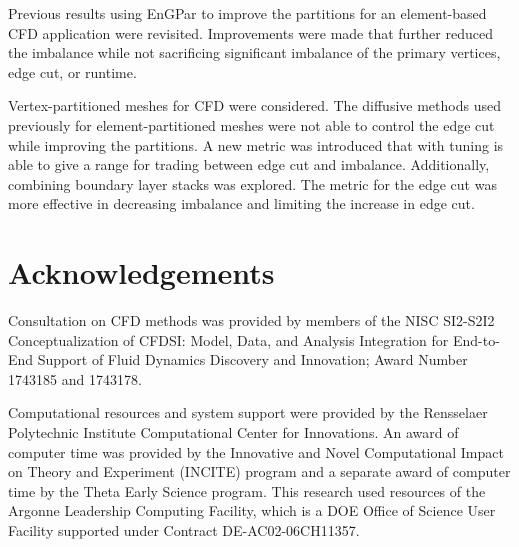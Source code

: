 \documentclass[conference]{IEEEtran}
\begin{document}
Previous results using EnGPar to improve the partitions for an element-based CFD application
were revisited. Improvements were made that further reduced the
imbalance while not sacrificing significant imbalance of the primary vertices,
edge cut, or runtime.

Vertex-partitioned meshes for CFD were considered. The diffusive methods used previously for
element-partitioned meshes were not able to control the edge cut while improving the partitions.
A new metric was introduced that with tuning is able to give a range for trading between edge
cut and imbalance. Additionally, combining boundary layer stacks was explored. The metric for
the edge cut was more effective in decreasing imbalance and limiting the increase in edge cut.

\section{Acknowledgements}

Consultation on CFD methods was provided by members of the NISC SI2-S2I2
Conceptualization of CFDSI: Model, Data, and Analysis Integration for End-to-End
Support of Fluid Dynamics Discovery and Innovation; Award Number 1743185 and 
1743178.

Computational resources and system support were provided by the Rensselaer
Polytechnic Institute Computational Center for Innovations.
An award of computer time was provided by the Innovative and Novel Computational
Impact on Theory and Experiment (INCITE) program and a separate award of
computer time by the Theta Early Science program.
This research used resources of the Argonne Leadership Computing Facility, which
is a DOE Office of Science User Facility supported under Contract
DE-AC02-06CH11357.





\end{document}
